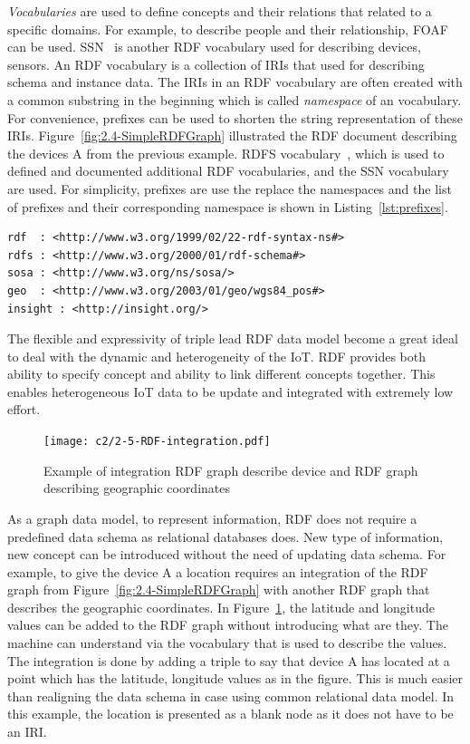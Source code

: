 {\textit{Vocabularies} are used to define concepts and their relations that related to a specific domains. 
For example, to describe people and their relationship, FOAF~\citep{Dan:2010} can be used.
SSN~\citep{Armin:2017} is another RDF vocabulary used for describing devices, sensors.
An RDF vocabulary is a collection of IRIs that used for describing schema and instance data.
The IRIs in an RDF vocabulary are often created with a common substring in the beginning which is called \textit{namespace} of an vocabulary.
For convenience, prefixes can be used to shorten the string representation of these IRIs.
Figure~\ref{fig:2.4-SimpleRDFGraph} illustrated the RDF document describing the devices A from the previous example.
RDFS vocabulary~\citep{Dan:2014}, which is used to defined and documented additional RDF vocabularies, and the SSN vocabulary are used.
For simplicity, prefixes are use the replace the namespaces and the list of prefixes and their corresponding namespace is shown in Listing~\ref{lst:prefixes}.

\vspace{5mm}
\begin{lstlisting}[language=sparql,
  				   captionpos=b,
                   label={lst:prefixes},
                   caption={Prefixes}]  
rdf  : <http://www.w3.org/1999/02/22-rdf-syntax-ns#>
rdfs : <http://www.w3.org/2000/01/rdf-schema#>
sosa : <http://www.w3.org/ns/sosa/>
geo  : <http://www.w3.org/2003/01/geo/wgs84_pos#>
insight : <http://insight.org/>
\end{lstlisting}


The flexible and expressivity of triple lead RDF data model become a great ideal to deal with the dynamic and heterogeneity of the IoT.
RDF  provides both ability to specify concept and ability to link different concepts together.
This enables heterogeneous IoT data to be update and integrated with extremely low effort.

\begin{figure}[ht!]
	\centering
	\texttt{[image: c2/2-5-RDF-integration.pdf]}
	\caption{Example of integration RDF graph describe device and RDF graph describing geographic coordinates}
	\label{fig:2.5-integration}
\end{figure}

As a graph data model, to represent information, RDF does not require a predefined data schema as relational databases does.
New type of information, new concept can be introduced without the need of updating data schema.
For example, to give the device A a location requires an integration of the RDF graph from Figure~\ref{fig:2.4-SimpleRDFGraph} with another RDF graph that describes the geographic coordinates.
In Figure~\ref{fig:2.5-integration}, the latitude and longitude values can be added to the RDF graph without introducing what are they.
The machine can understand via the vocabulary that is used to describe the values.
The integration is done by adding a triple to say that device A has located at a point which has the latitude, longitude values as in the figure.
This is much easier than realigning the data schema in case using common relational data model. 
In this example, the location is presented as a blank node as it does not have to be an IRI.

}
